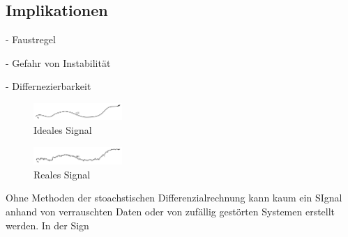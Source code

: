 \subsection{Implikationen\label{brown:Rauschen:Implikationen}}
- Faustregel

- Gefahr von Instabilität

- Differnezierbarkeit
\begin{figure}
	\centering
	\includegraphics[width=0.3\textwidth]{papers/brown/images/idealSignal.png}
	\caption{Ideales Signal}
	\label{idealSignal}
\end{figure}
\begin{figure}
	\centering
	\includegraphics[width=0.3\textwidth]{papers/brown/images/realSignal.png}
	\caption{Reales Signal}
	\label{realSignal}
\end{figure}

Ohne Methoden der stoachstischen Differenzialrechnung kann kaum ein SIgnal anhand von verrauschten Daten oder von zufällig gestörten Systemen erstellt werden. In der Sign